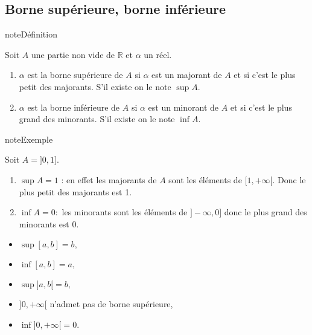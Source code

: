 \documentclass[letterpaper,10pt,french]{jupyterBook}
\begin{document}
\subsection{Borne supérieure, borne inférieure}
\label{\detokenize{proprties:borne-superieure-borne-inferieure}}
\begin{sphinxadmonition}{note}{Définition}

\sphinxAtStartPar
Soit \(A\) une partie non vide de \(\mathbb{R}\) et \(\alpha\) un réel.
\begin{enumerate}
%
\item {} 
\sphinxAtStartPar
\(\alpha\) est la borne supérieure de \(A\) si \(\alpha\) est un majorant de \(A\) et si c’est le plus petit des majorants. S’il existe on le
note \(\sup A.\)

\item {} 
\sphinxAtStartPar
\(\alpha\) est la borne inférieure de \(A\) si \(\alpha\) est un minorant de \(A\) et si c’est le plus grand des minorants. S’il existe on le
note \(\inf A.\)

\end{enumerate}
\end{sphinxadmonition}

\begin{sphinxadmonition}{note}{Exemple}

\sphinxAtStartPar
Soit \(A =]0,1].\)
\begin{enumerate}
%
\item {} 
\sphinxAtStartPar
\(\sup A = 1\) : en effet les majorants de \(A\) sont les éléments de \([1,+\infty[.\) Donc le plus petit des majorants est 1.

\item {} 
\sphinxAtStartPar
\(\inf A = 0:\) les minorants sont les éléments de \(] −\infty,0]\) donc le plus grand des minorants est 0.

\end{enumerate}
\begin{itemize}
\item {} 
\sphinxAtStartPar
\(\sup[a, b] = b,\)

\item {} 
\sphinxAtStartPar
\(\inf[a, b]=a,\)

\item {} 
\sphinxAtStartPar
\(\sup]a, b[= b,\)

\item {} 
\sphinxAtStartPar
\(]0,+\infty[\) n’admet pas de borne supérieure,

\item {} 
\sphinxAtStartPar
\(\inf]0,+\infty[= 0.\)

\end{itemize}
\end{sphinxadmonition}
\end{document}
